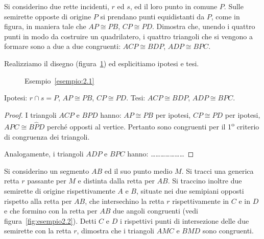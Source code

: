 \begin{exrig}
\begin{esempio}\label{esempio:2.1}
Si considerino due rette incidenti, \(r\) ed \(s\), ed il loro punto in 
comune \(P\). Sulle semirette opposte di origine \(P\) si prendano punti 
equidistanti da \(P\), come in figura, in maniera tale che \(AP\cong 
PB\), \(CP\cong PD\). Dimostra che, unendo i quattro punti in modo da 
costruire un quadrilatero, i quattro triangoli che si vengono a 
formare sono a due a due congruenti: \(ACP\cong BDP\), \(ADP\cong BPC\).

Realizziamo il disegno (figura~\ref{fig:esempio2.1}) ed esplicitiamo 
ipotesi e tesi.


\begin{inaccessibleblock}
 \begin{figure}[htb]
\centering
\caption{Esempio~\ref{esempio:2.1}}\label{fig:esempio2.1}
\end{figure}
\end{inaccessibleblock}

\noindent Ipotesi: \(r\cap s=P\), \(AP\cong PB\), \(CP\cong PD\).\tab\tab 
Tesi: \(ACP\cong BDP\), \(ADP\cong BPC\).

\begin{proof}
I triangoli \(ACP\) e \(BPD\) hanno: \(AP\cong PB\) per ipotesi, \(CP\cong 
PD\) per ipotesi, \(A\widehat{P}C\cong B\widehat{P}D\) perché opposti al 
vertice. Pertanto sono congruenti per il 1\textsuperscript{o} 
criterio di congruenza dei triangoli.

Analogamente, i triangoli \(ADP\) e \(BPC\) hanno: 
\ldots\ldots\ldots\ldots\ldots\ldots\ldots
\end{proof}
\end{esempio}

\begin{esempio}\label{esempio:2.2}
Si considerino un segmento \(AB\) ed il suo punto medio \(M\). Si tracci 
una generica retta \(r\) passante per \(M\) e distinta dalla retta per 
\(AB\). Si traccino inoltre due semirette di origine rispettivamente 
\(A\) e \(B\), situate nei due semipiani opposti rispetto alla retta per 
\(AB\), che intersechino la retta \(r\) rispettivamente in \(C\) e in \(D\) e 
che formino con la retta per \(AB\) due angoli congruenti (vedi 
figura~\ref{fig:esempio2.2}). Detti \(C\) e \(D\) i rispettivi punti di 
intersezione delle due semirette con la retta \(r\), dimostra che i 
triangoli \(AMC\) e \(BMD\) sono congruenti.



\end{esempio}
\end{exrig}

